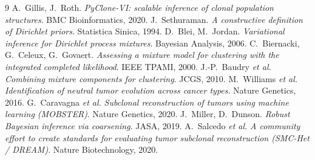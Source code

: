 \documentclass[11pt,a4paper]{article}
\theoremstyle{remark}
\begin{document}
\begin{thebibliography}{9}
 A.~Gillis, J.~Roth. \emph{PyClone-VI: scalable inference of clonal
population structures}. BMC Bioinformatics, 2020.
 J.~Sethuraman. \emph{A constructive definition of Dirichlet priors}.
Statistica Sinica, 1994.
 D.~Blei, M.~Jordan. \emph{Variational inference for Dirichlet process
mixtures}. Bayesian Analysis, 2006.
 C.~Biernacki, G.~Celeux, G.~Govaert. \emph{Assessing a mixture model for
clustering with the integrated completed likelihood}. IEEE TPAMI, 2000.
 J.-P.~Baudry \emph{et al.} \emph{Combining mixture components for
clustering}. JCGS, 2010.
 M.~Williams \emph{et al.} \emph{Identification of neutral tumor evolution
across cancer types}. Nature Genetics, 2016.
 G.~Caravagna \emph{et al.} \emph{Subclonal reconstruction of tumors using
machine learning (MOBSTER)}. Nature Genetics, 2020.
 J.~Miller, D.~Dunson. \emph{Robust Bayesian inference via coarsening}.
JASA, 2019.
 A.~Salcedo \emph{et al.} \emph{A community effort to create standards for
evaluating tumor subclonal reconstruction (SMC-Het / DREAM)}. Nature Biotechnology, 2020.
\end{thebibliography}
\end{document}
